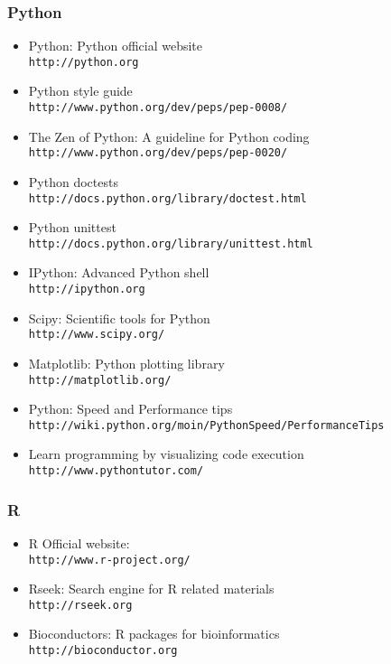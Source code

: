 \documentclass[ChapterTOCs,krantz2]{krantz} %
\begin{document}
\subsubsection{Python}
\begin{itemize}
\item Python: Python official website\\ \texttt{http://python.org}
\item Python style guide\\ \texttt{http://www.python.org/dev/peps/pep-0008/}
\item The Zen of Python: A guideline for Python coding \\\texttt{http://www.python.org/dev/peps/pep-0020/}
\item Python doctests \\\texttt{http://docs.python.org/library/doctest.html}
\item Python unittest \\\texttt{http://docs.python.org/library/unittest.html}
\item IPython: Advanced Python shell \\\texttt{http://ipython.org}
\item Scipy: Scientific tools for Python \\\texttt{http://www.scipy.org/}
\item Matplotlib: Python plotting library \\\texttt{http://matplotlib.org/}
\item Python: Speed and Performance tips \\\texttt{http://wiki.python.org/moin/PythonSpeed/PerformanceTips}
\item Learn programming by visualizing code execution \\\texttt{http://www.pythontutor.com/}
\end{itemize}

\subsubsection{R}
\begin{itemize}
\item R Official website: \\\texttt{http://www.r-project.org/}
\item Rseek: Search engine for R related materials \\\texttt{http://rseek.org}
\item Bioconductors: R packages for bioinformatics \\\texttt{http://bioconductor.org}
\end{itemize}
\end{document}
